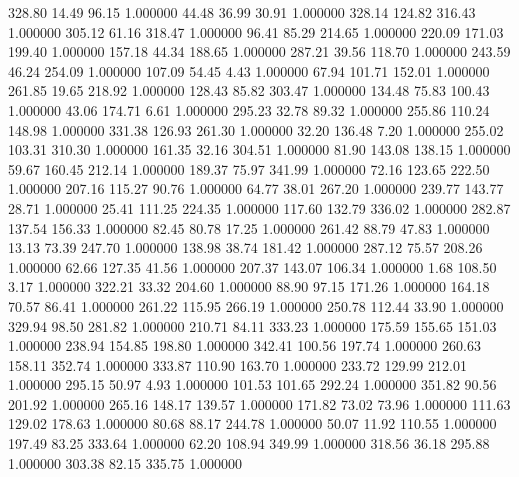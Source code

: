     328.80     14.49     96.15  1.000000
     44.48     36.99     30.91  1.000000
    328.14    124.82    316.43  1.000000
    305.12     61.16    318.47  1.000000
     96.41     85.29    214.65  1.000000
    220.09    171.03    199.40  1.000000
    157.18     44.34    188.65  1.000000
    287.21     39.56    118.70  1.000000
    243.59     46.24    254.09  1.000000
    107.09     54.45      4.43  1.000000
     67.94    101.71    152.01  1.000000
    261.85     19.65    218.92  1.000000
    128.43     85.82    303.47  1.000000
    134.48     75.83    100.43  1.000000
     43.06    174.71      6.61  1.000000
    295.23     32.78     89.32  1.000000
    255.86    110.24    148.98  1.000000
    331.38    126.93    261.30  1.000000
     32.20    136.48      7.20  1.000000
    255.02    103.31    310.30  1.000000
    161.35     32.16    304.51  1.000000
     81.90    143.08    138.15  1.000000
     59.67    160.45    212.14  1.000000
    189.37     75.97    341.99  1.000000
     72.16    123.65    222.50  1.000000
    207.16    115.27     90.76  1.000000
     64.77     38.01    267.20  1.000000
    239.77    143.77     28.71  1.000000
     25.41    111.25    224.35  1.000000
    117.60    132.79    336.02  1.000000
    282.87    137.54    156.33  1.000000
     82.45     80.78     17.25  1.000000
    261.42     88.79     47.83  1.000000
     13.13     73.39    247.70  1.000000
    138.98     38.74    181.42  1.000000
    287.12     75.57    208.26  1.000000
     62.66    127.35     41.56  1.000000
    207.37    143.07    106.34  1.000000
      1.68    108.50      3.17  1.000000
    322.21     33.32    204.60  1.000000
     88.90     97.15    171.26  1.000000
    164.18     70.57     86.41  1.000000
    261.22    115.95    266.19  1.000000
    250.78    112.44     33.90  1.000000
    329.94     98.50    281.82  1.000000
    210.71     84.11    333.23  1.000000
    175.59    155.65    151.03  1.000000
    238.94    154.85    198.80  1.000000
    342.41    100.56    197.74  1.000000
    260.63    158.11    352.74  1.000000
    333.87    110.90    163.70  1.000000
    233.72    129.99    212.01  1.000000
    295.15     50.97      4.93  1.000000
    101.53    101.65    292.24  1.000000
    351.82     90.56    201.92  1.000000
    265.16    148.17    139.57  1.000000
    171.82     73.02     73.96  1.000000
    111.63    129.02    178.63  1.000000
     80.68     88.17    244.78  1.000000
     50.07     11.92    110.55  1.000000
    197.49     83.25    333.64  1.000000
     62.20    108.94    349.99  1.000000
    318.56     36.18    295.88  1.000000
    303.38     82.15    335.75  1.000000
